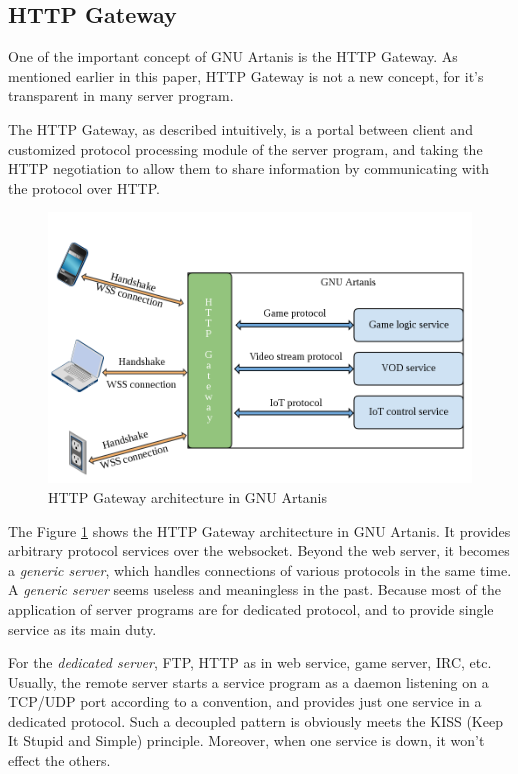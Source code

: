\documentclass[numbers,numberedpars]{sigplanconf}
\begin{document}
\subsection{HTTP Gateway} \label{HTTP Gateway}

One of the important concept of GNU Artanis is the HTTP Gateway. As mentioned earlier in this paper, HTTP Gateway is not a new concept,
for it's transparent in many server program.

The HTTP Gateway, as described intuitively, is a portal between client and customized protocol processing module of the server program,
and taking the HTTP negotiation to allow them to share information by communicating with the protocol over HTTP.

\begin{figure}[tbph]
  \centering
  \includegraphics[scale=0.25]{httpgw.png}
  \caption{HTTP Gateway architecture in GNU Artanis}
  \label{fig:httpgw}
\end{figure}

The Figure \ref{fig:httpgw} shows the HTTP Gateway architecture in GNU Artanis.
It provides arbitrary protocol services over the websocket. Beyond the web server, it becomes a {\it generic server}, which handles
connections of various protocols in the
same time. A {\it generic server} seems useless and meaningless in the past. Because most of the application of server programs are for
dedicated protocol, and to provide single service as its main duty.

For the {\it dedicated server}, FTP, HTTP as in web service, game server, IRC, etc. Usually, the remote server starts a service program
as a daemon listening on a TCP/UDP port according to a convention, and provides just one service in a dedicated protocol. Such a decoupled
pattern is obviously meets the KISS (Keep It Stupid and Simple) principle. Moreover, when one service is down, it won't effect the others.
\end{document}
